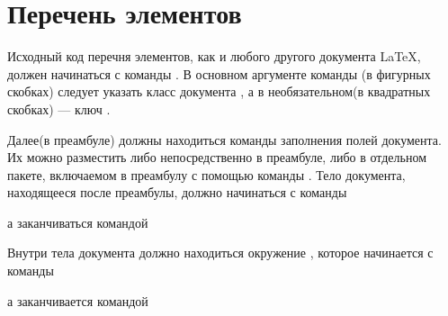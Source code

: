 
\section{Перечень элементов}

Исходный код перечня элементов, как и любого другого документа \LaTeX{}, должен
начинаться с команды . В основном аргументе команды%
(в фигурных скобках) следует указать класс документа , а в
необязательном(в квадратных скобках) --- ключ .


Далее(в преамбуле) должны находиться команды заполнения полей документа. Их можно
разместить либо непосредственно в преамбуле, либо в отдельном пакете, включаемом в
преамбулу с помощью команды . Тело документа,
находящееся после преамбулы, должно начинаться с команды


а заканчиваться командой


Внутри тела документа должно находиться
окружение , которое начинается с команды


а заканчивается командой


